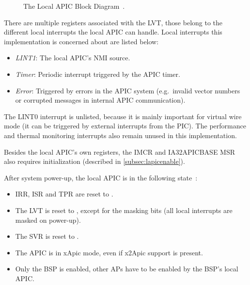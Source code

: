 \begin{figure}[h]
  \centering
  \begin{subfigure}[b]{0.9\textwidth}
    
  \end{subfigure}
  \caption{The Local APIC Block Diagram~\autocite[sec.~3.11.4.1]{ia32}.}
  \label{fig:localapicblock}
\end{figure}

There are multiple registers associated with the LVT, those belong to the different local interrupts the local APIC can handle.
Local interrupts this implementation is concerned about are listed below:

\begin{itemize}
  \item \textit{LINT1}: The local APIC's NMI source.
  \item \textit{Timer}: Periodic interrupt triggered by the APIC timer.
  \item \textit{Error}: Triggered by errors in the APIC system (e.g.\ invalid vector numbers or corrupted messages in internal APIC communication).
\end{itemize}

The LINT0 interrupt is unlisted, because it is mainly important for virtual wire mode (it can be triggered by external interrupts from the PIC).
The performance and thermal monitoring interrupts also remain unused in this implementation.

Besides the local APIC's own registers, the IMCR and IA32\textunderscore{}APIC\textunderscore{}BASE MSR also requires initialization (described in \autoref{subsec:lapicenable}).

After system power-up, the local APIC is in the following state~\autocite[sec.~3.11.4.7]{ia32}:

\begin{itemize}
  \item IRR, ISR and TPR are reset to .
  \item The LVT is reset to , except for the masking bits (all local interrupts are masked on power-up).
  \item The SVR is reset to .
  \item The APIC is in xApic mode, even if x2Apic support is present.
  \item Only the BSP is enabled, other APs have to be enabled by the BSP's local APIC\@.
\end{itemize}


